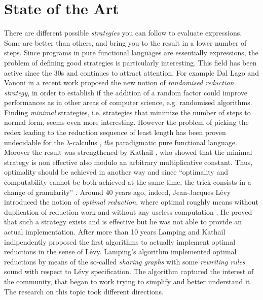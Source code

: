 \documentclass[english]{scrartcl}
\begin{document}
\section{State of the Art}
There are different possible \emph{strategies} you can follow to evaluate expressions. Some are better than others, and bring you to the result in a lower number of steps. Since programs in pure functional languages are essentially expressions, the problem of defining good strategies is particularly interesting. This field has been active since the 30s and continues to attract attention. For example Dal Lago and Vanoni in a recent work  \cite{dal_lago_randomised_2018} proposed the new notion of \emph{randomised reduction strategy}, in order to establish if the addition of a random factor could improve performances as in other areas of computer science, e.g. randomised algorithms. Finding \emph{minimal} strategies, i.e. strategies that minimize the number of steps to normal form, seems even more interesting. However the problem of picking the redex leading to the reduction sequence of least length has been proven undecidable for the $\lambda$-calculus \cite[Section~13.5]{barendregt_lambda_1984}, \emph{the} paradigmatic pure functional language. Morover the result was strengthened by Kathail \cite[Appendix]{kathail_optimal_1990}, who showed that the minimal strategy is non effective also modulo an arbitrary multiplicative constant. Thus, optimality should be achieved in another way and since ``optimality and computability cannot be both achieved at the same time, the trick consists in a change of granularity'' \cite{terese_term_2003}. Around 40 years ago, indeed, Jean-Jacques Lévy introduced the notion of \emph{optimal reduction}, where optimal roughly means without duplication of reduction work and without any useless computation \cite{levy_reductions_1978}. He proved that such a strategy exists and is effective but he was not able to provide an actual implementation. After more than 10 years Lamping \cite{lamping_algorithm_1990} and Kathail \cite{kathail_optimal_1990} indipendently proposed the first algorithms to actually implement optimal reductions in the sense of Lévy. Lamping's algorithm implemented optimal reductions by means of the so-called \emph{sharing graphs} with some \emph{rewriting rules} sound with respect to Lévy specification. The algorithm captured the interest of the community, that began to work trying to simplify and better understand it. The research on this topic took different directions.
\end{document}
